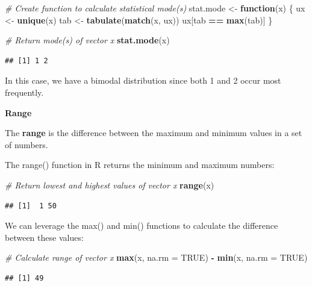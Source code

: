 \documentclass[]{book}
\newenvironment{Shaded}{\begin{snugshade}}{\end{snugshade}}
\newcommand{\CommentTok}[1]{\textcolor[rgb]{0.56,0.35,0.01}{\textit{#1}}}
\newcommand{\ControlFlowTok}[1]{\textcolor[rgb]{0.13,0.29,0.53}{\textbf{#1}}}
\newcommand{\DataTypeTok}[1]{\textcolor[rgb]{0.13,0.29,0.53}{#1}}
\newcommand{\KeywordTok}[1]{\textcolor[rgb]{0.13,0.29,0.53}{\textbf{#1}}}
\newcommand{\NormalTok}[1]{#1}
\newcommand{\OperatorTok}[1]{\textcolor[rgb]{0.81,0.36,0.00}{\textbf{#1}}}
\newcommand{\OtherTok}[1]{\textcolor[rgb]{0.56,0.35,0.01}{#1}}
\newcommand{\StringTok}[1]{\textcolor[rgb]{0.31,0.60,0.02}{#1}}
\begin{document}
\begin{Shaded}
\begin{Highlighting}[]
\CommentTok{# Create function to calculate statistical mode(s)}
\NormalTok{stat.mode <-}\StringTok{ }\ControlFlowTok{function}\NormalTok{(x) \{}
\NormalTok{  ux <-}\StringTok{ }\KeywordTok{unique}\NormalTok{(x)}
\NormalTok{  tab <-}\StringTok{ }\KeywordTok{tabulate}\NormalTok{(}\KeywordTok{match}\NormalTok{(x, ux))}
\NormalTok{  ux[tab }\OperatorTok{==}\StringTok{ }\KeywordTok{max}\NormalTok{(tab)]}
\NormalTok{\}}

\CommentTok{# Return mode(s) of vector x}
\KeywordTok{stat.mode}\NormalTok{(x)}
\end{Highlighting}
\end{Shaded}

\begin{verbatim}
## [1] 1 2
\end{verbatim}

In this case, we have a bimodal distribution since both 1 and 2 occur most frequently.

\textbf{Range}

The \textbf{range} is the difference between the maximum and minimum values in a set of numbers.

The range() function in R returns the minimum and maximum numbers:

\begin{Shaded}
\begin{Highlighting}[]
\CommentTok{# Return lowest and highest values of vector x}
\KeywordTok{range}\NormalTok{(x)}
\end{Highlighting}
\end{Shaded}

\begin{verbatim}
## [1]  1 50
\end{verbatim}

We can leverage the max() and min() functions to calculate the difference between these values:

\begin{Shaded}
\begin{Highlighting}[]
\CommentTok{# Calculate range of vector x}
\KeywordTok{max}\NormalTok{(x, }\DataTypeTok{na.rm =} \OtherTok{TRUE}\NormalTok{) }\OperatorTok{-}\StringTok{ }\KeywordTok{min}\NormalTok{(x, }\DataTypeTok{na.rm =} \OtherTok{TRUE}\NormalTok{)}
\end{Highlighting}
\end{Shaded}

\begin{verbatim}
## [1] 49
\end{verbatim}
\end{document}
